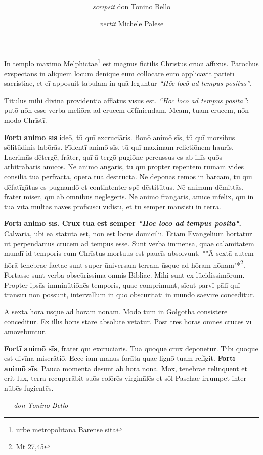 \documentclass[a4paper, 12pt]{article}
\title{
	\Huge{\MyTitle}
}
\author{
	\textit{scrīpsit} don Tonino Bello \and \textit{vertit} Michele Palese
}
\date{}
\begin{document}
	\maketitle
	
	In templō maximō Melphictae\footnote{urbe mētropolītānā Bārēnse sita} est magnus fictilis Chrīstus crucī affīxus.
	Parochus exspectāns in aliquem locum dēnique eum collocāre eum applicāvit parietī sacristiae, et eī apposuit tabulam in quā leguntur \textit{``Hōc locō ad tempus positus''}.
	
	Titulus mihi divinā prōvidentiā afflātus vīsus est.
	\textit{``Hōc locō ad tempus posita''}: putō nōn esse verba meliōra ad crucem dēfīniendam.
	Meam, tuam crucem, nōn modo Chrīstī.
	
	\textbf{Fortī animō sīs} ideō, tū quī excruciāris.
	Bonō animō sīs, tū quī morsibus sōlitūdinis labōrās.
	Fīdentī animō sīs, tū quī maximam relictiōnem haurīs.
	Lacrimās dētergē, frāter, quī ā tergō pugiōne percussus es ab illīs quōs arbitrābāris amīcōs.
	Nē animō angāris, tū quī propter repentem ruīnam vidēs cōnsilia tua perfrācta, opera tua dēstrūcta.
	Nē dēpōnās rēmōs in barcam, tū quī dēfatīgātus es pugnandō et contintenter spē dēstitūtus.
	Nē animum dēmittās, frāter miser, quī ab omnibus neglegeris.
	Nē animō frangāris, amīce īnfēlix, quī in tuā vītā multās nāvēs proficīscī vīdistī, et tū semper mānsistī in terrā.
	
	\textbf{Fortī animō sīs. Crux tua est semper \textit{"Hōc locō ad tempus posita"}.}
	Calvāria, ubi ea statūta est, nōn est locus domiciliī. Etiam Ēvangelium
	hortātur ut perpendāmus crucem ad tempus esse. Sunt verba immēnsa, quae
	calamitātem mundī id temporis cum Chrīstus mortuus est paucīs absolvunt.
	*"Ā sextā autem hōrā tenebrae factae sunt super ūniversam terram ūsque
	ad hōram nōnam"*\footnote{Mt 27,45}. Fortasse sunt verba obscūrissima omnis Bibliae.
	Mihi sunt ex lūcidissimōrum. Propter ipsās imminūtiōnēs temporis, quae
	comprimunt, sīcut parvī pālī quī trānsīrī nōn possunt, intervallum in
	quō obscūritātī in mundō saevīre concēditur.
	
	Ā sextā hōrā ūsque ad hōram nōnam. Modo tum in Golgothā cōnsistere
	concēditur. Ex illīs hōrīs stāre absolūtē vetātur. Post trēs hōrās omnēs
	crucēs vī āmovēbuntur.
	
	\textbf{Fortī animō sīs}, frāter quī excruciāris.
	Tua quoque crux dēpōnētur.
	Tibī quoque est divīna miserātiō.
	Ecce iam manus forāta quae lignō tuam refīgit.
	\textbf{Fortī animō sīs}.
	Pauca momenta dēsunt ab hōrā nōnā.
	Mox, tenebrae relinquent et erit lux, terra recuperābit suōs colōrēs virginālēs et sōl Paschae irrumpet inter nūbēs fugientēs.
	
	\bigskip
	
	\raggedleft \textit{--- don Tonino Bello} \hspace{1em}
\end{document}
